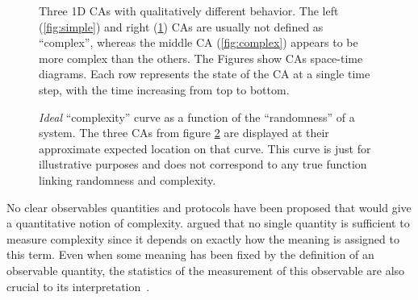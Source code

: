 \begin{figure}[htbp]
\begin{subfigure}[b]{.31\linewidth}
    \caption{}
   \label{fig:random}
  \end{subfigure}
  \caption{Three 1D \aclp{CA} with qualitatively different behavior. The left
    (\ref{fig:simple}) and right (\ref{fig:random}) \acp{CA} are usually not
    defined as ``complex'', whereas the middle \ac{CA} (\ref{fig:complex})
    appears to be more complex than the others. The Figures show \acp{CA} space-time 
    diagrams. Each row represents the state of the \ac{CA} at a single time step, with 
    the time increasing from top to bottom.}
  \label{fig:three_eca_complex}
\end{figure}

\begin{figure}[htbp]
  \centering
\caption{\emph{Ideal} ``complexity'' curve as a function of the ``randomness''
  of a system. The three \acp{CA} from figure \ref{fig:three_eca_complex} are
  displayed at their approximate expected location on that curve. This curve is
  just for illustrative purposes and does not correspond to any true function
  linking randomness and complexity.}
\label{fig:complexity_curve}
\end{figure}

No clear observables quantities and protocols have been proposed that would give a
quantitative notion of complexity.
\textcite{grassbergerProblemsQuantifyingSelfgenerated1989} argued that no single
quantity is sufficient to measure complexity since it depends on exactly how the
meaning is assigned to this term. Even when some meaning has been fixed by the
definition of an observable quantity, the statistics of the measurement of this
observable are also crucial to its
interpretation~\parencite{gutowitzCellularAutomataSciences1995}.

